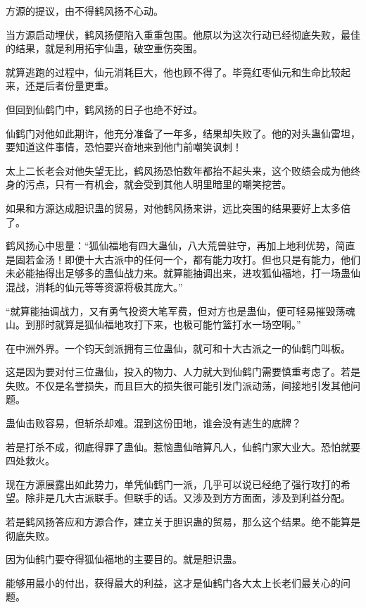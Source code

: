 
\begin{this_body}



方源的提议，由不得鹤风扬不心动。

当方源启动埋伏，鹤风扬便陷入重重包围。他原以为这次行动已经彻底失败，最佳的结果，就是利用拓宇仙蛊，破空重伤突围。

就算逃跑的过程中，仙元消耗巨大，他也顾不得了。毕竟红枣仙元和生命比较起来，还是后者份量更重。

但回到仙鹤门中，鹤风扬的日子也绝不好过。

仙鹤门对他如此期许，他充分准备了一年多，结果却失败了。他的对头蛊仙雷坦，要知道这件事情，恐怕要兴奋地来到他门前嘲笑讽刺！

太上二长老会对他失望无比，鹤风扬恐怕数年都抬不起头来，这个败绩会成为他终身的污点，只有一有机会，就会受到其他人明里暗里的嘲笑挖苦。

如果和方源达成胆识蛊的贸易，对他鹤风扬来讲，远比突围的结果要好上太多倍了。

鹤风扬心中思量：“狐仙福地有四大蛊仙，八大荒兽驻守，再加上地利优势，简直是固若金汤！即便十大古派中的任何一个，都有能力攻打。但也只是有能力，他们未必能抽得出足够多的蛊仙战力来。就算能抽调出来，进攻狐仙福地，打一场蛊仙混战，消耗的仙元等等资源将极其庞大。”

“就算能抽调战力，又有勇气投资大笔军费，但对方也是蛊仙，便可轻易摧毁荡魂山。到那时就算是狐仙福地攻打下来，也极可能竹篮打水一场空啊。”

在中洲外界。一个钧天剑派拥有三位蛊仙，就可和十大古派之一的仙鹤门叫板。

这是因为要对付三位蛊仙，投入的物力、人力就大到仙鹤门需要慎重考虑了。若是失败。不仅是名誉损失，而且巨大的损失很可能引发门派动荡，间接地引发其他问题。

蛊仙击败容易，但斩杀却难。混到这份田地，谁会没有逃生的底牌？

若是打杀不成，彻底得罪了蛊仙。惹恼蛊仙暗算凡人，仙鹤门家大业大。恐怕就要四处救火。

现在方源展露出如此势力，单凭仙鹤门一派，几乎可以说已经绝了强行攻打的希望。除非是几大古派联手。但联手的话。又涉及到方方面面，涉及到利益分配。

若是鹤风扬答应和方源合作，建立关于胆识蛊的贸易，那么这个结果。绝不能算是彻底失败。

因为仙鹤门要夺得狐仙福地的主要目的。就是胆识蛊。

能够用最小的付出，获得最大的利益，这才是仙鹤门各大太上长老们最关心的问题。


\end{this_body}
